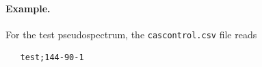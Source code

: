 \documentclass[a4paper,11pt]{article}
\begin{document}
\paragraph{Example.} For the test pseudospectrum, the \verb|cascontrol.csv| file reads
\begin{verbatim}
   test;144-90-1
\end{verbatim}
\end{document}
